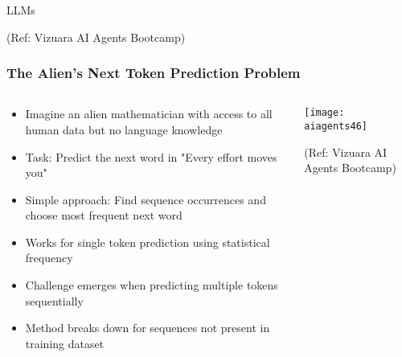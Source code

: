\begin{frame}[fragile]\frametitle{}
\begin{center}
{\Large LLMs}

{\tiny (Ref: Vizuara AI Agents Bootcamp)}
\end{center}
\end{frame}

\begin{frame}[fragile]\frametitle{The Alien's Next Token Prediction Problem}

\begin{columns}
    \begin{column}[T]{0.6\linewidth}
      \begin{itemize}
	  \item Imagine an alien mathematician with access to all human data but no language knowledge
	  \item Task: Predict the next word in "Every effort moves you"
	  \item Simple approach: Find sequence occurrences and choose most frequent next word
	  \item Works for single token prediction using statistical frequency
	  \item Challenge emerges when predicting multiple tokens sequentially
	  \item Method breaks down for sequences not present in training dataset
	  \end{itemize}

    \end{column}
    \begin{column}[T]{0.4\linewidth}
		\begin{center}
		\texttt{[image: aiagents46]}

		{\tiny (Ref: Vizuara AI Agents Bootcamp)}

		\end{center}	
    \end{column}
  \end{columns}
  
\end{frame}

